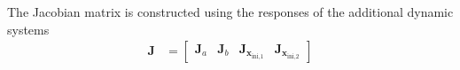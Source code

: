 The Jacobian matrix is constructed using the responses of the additional dynamic systems  
\begin{equation} \begin{aligned} \mathbf{J} &= \begin{bmatrix} \mathbf{J}_a & \mathbf{J}_b & \mathbf{J}_{\mathbf{x}_{\text{ini,1}}} & \mathbf{J}_{\mathbf{x}_{\text{ini,2}}} \end{bmatrix} \end{aligned} \end{equation}


